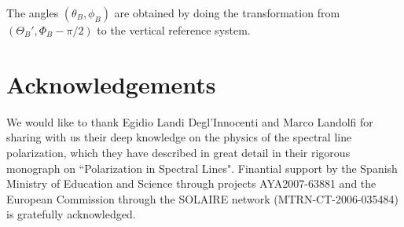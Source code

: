 \documentclass[12pt]{article}
\begin{document}
The angles $(\theta_B,\phi_B)$ are obtained by doing the transformation from $(\Theta_B',\Phi_B-\pi/2)$ to the
vertical reference system.


\section*{Acknowledgements}
We would like to thank Egidio Landi Degl'Innocenti and Marco Landolfi
for sharing with us their deep knowledge on the physics of the spectral line polarization,
which they have described in great detail in their
rigorous monograph on ``Polarization in Spectral Lines". Finantial support by 
the Spanish Ministry of Education and Science through projects AYA2007-63881 and 
the European Commission through the SOLAIRE network (MTRN-CT-2006-035484) is gratefully acknowledged.



% 
\end{document}
